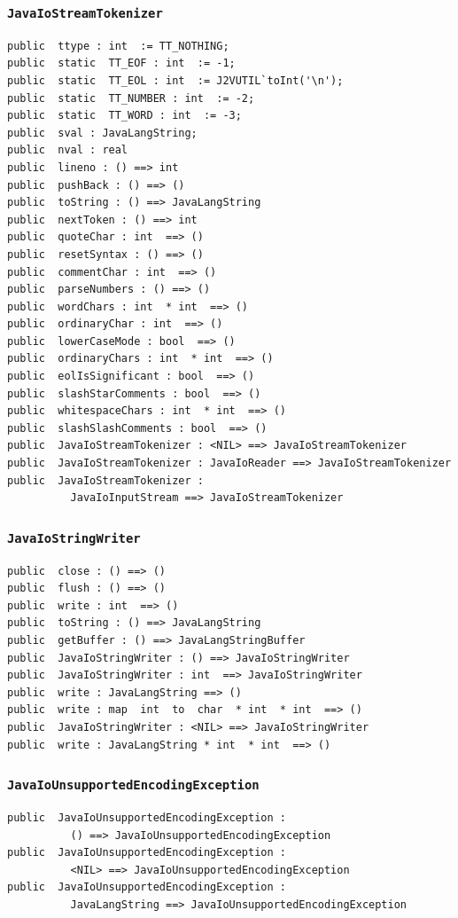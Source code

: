 \documentclass[\pformat,12pt]{article}
\begin{document}
\subsubsection{\texttt{JavaIoStreamTokenizer}}
\begin{small}
\begin{verbatim}
public  ttype : int  := TT_NOTHING;
public  static  TT_EOF : int  := -1;
public  static  TT_EOL : int  := J2VUTIL`toInt('\n');
public  static  TT_NUMBER : int  := -2;
public  static  TT_WORD : int  := -3;
public  sval : JavaLangString;
public  nval : real
public  lineno : () ==> int
public  pushBack : () ==> ()
public  toString : () ==> JavaLangString
public  nextToken : () ==> int
public  quoteChar : int  ==> ()
public  resetSyntax : () ==> ()
public  commentChar : int  ==> ()
public  parseNumbers : () ==> ()
public  wordChars : int  * int  ==> ()
public  ordinaryChar : int  ==> ()
public  lowerCaseMode : bool  ==> ()
public  ordinaryChars : int  * int  ==> ()
public  eolIsSignificant : bool  ==> ()
public  slashStarComments : bool  ==> ()
public  whitespaceChars : int  * int  ==> ()
public  slashSlashComments : bool  ==> ()
public  JavaIoStreamTokenizer : <NIL> ==> JavaIoStreamTokenizer
public  JavaIoStreamTokenizer : JavaIoReader ==> JavaIoStreamTokenizer
public  JavaIoStreamTokenizer : 
          JavaIoInputStream ==> JavaIoStreamTokenizer
\end{verbatim}
\end{small}

\subsubsection{\texttt{JavaIoStringWriter}}
\begin{small}
\begin{verbatim}
public  close : () ==> ()
public  flush : () ==> ()
public  write : int  ==> ()
public  toString : () ==> JavaLangString
public  getBuffer : () ==> JavaLangStringBuffer
public  JavaIoStringWriter : () ==> JavaIoStringWriter
public  JavaIoStringWriter : int  ==> JavaIoStringWriter
public  write : JavaLangString ==> ()
public  write : map  int  to  char  * int  * int  ==> ()
public  JavaIoStringWriter : <NIL> ==> JavaIoStringWriter
public  write : JavaLangString * int  * int  ==> ()
\end{verbatim}
\end{small}

\subsubsection{\texttt{JavaIoUnsupportedEncodingException}}
\begin{small}
\begin{verbatim}
public  JavaIoUnsupportedEncodingException : 
          () ==> JavaIoUnsupportedEncodingException
public  JavaIoUnsupportedEncodingException : 
          <NIL> ==> JavaIoUnsupportedEncodingException
public  JavaIoUnsupportedEncodingException : 
          JavaLangString ==> JavaIoUnsupportedEncodingException
\end{verbatim}
\end{small}
\end{document}
